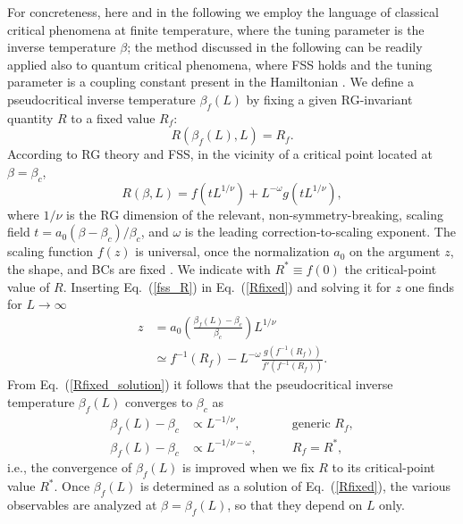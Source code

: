 \documentclass[pre,twocolumn]{revtex4-2}
\begin{document}
For concreteness, here and in the following we employ the language of classical critical phenomena at finite temperature, where the tuning parameter is the inverse temperature $\beta$;
the method discussed in the following can be readily applied also to quantum critical phenomena, where FSS holds and the tuning parameter is a coupling constant present in the Hamiltonian \cite{CPV-14}.
We define a pseudocritical inverse temperature $\beta_f(L)$ by fixing a given RG-invariant quantity $R$ to a fixed value $R_f$:
\begin{equation}
  R(\beta_f(L), L) = R_f.
  \label{Rfixed}
\end{equation}
According to RG theory and FSS, in the vicinity of a critical point located at $\beta=\beta_c$,
\begin{equation}
  R(\beta, L) = f(t L^{1/\nu}) + L^{-\omega}g(t L^{1/\nu}),
  \label{fss_R}
\end{equation}
where $1/\nu$ is the RG dimension of the relevant, non-symmetry-breaking, scaling field $t = a_0(\beta-\beta_c)/\beta_c$, and $\omega$ is the leading correction-to-scaling exponent.
The scaling function $f(z)$ is universal, once the normalization $a_0$ on the argument $z$, the shape, and BCs are fixed \cite{KOK-99,PTD-10,HGS-11,MFG-14}.
We indicate with $R^*\equiv f(0)$ the critical-point value of $R$.
Inserting Eq.~(\ref{fss_R}) in Eq.~(\ref{Rfixed}) and solving it for $z$ one finds for $L\rightarrow\infty$
\begin{equation}
  \begin{split}
    z &= a_0\left(\frac{\beta_f(L)-\beta_c}{\beta_c}\right)L^{1/\nu}\\
    &\simeq f^{-1}(R_f) - L^{-\omega}\frac{g(f^{-1}(R_f))}{f'(f^{-1}(R_f))}.
  \end{split}
  \label{Rfixed_solution}
\end{equation}
From Eq.~(\ref{Rfixed_solution}) it follows that the pseudocritical inverse temperature $\beta_f(L)$ converges to $\beta_c$ as
\begin{align}
  \label{betaf_vs_betac_gen}
  \beta_f(L)-\beta_c &\propto L^{-1/\nu}, \qquad &\text{generic $R_f$},\\
  \label{betaf_vs_betac_crit}
  \beta_f(L)-\beta_c &\propto L^{-1/\nu-\omega}, \qquad &R_f=R^*,
\end{align}
i.e., the convergence of $\beta_f(L)$ is improved when we fix $R$ to its critical-point value $R^*$.
Once $\beta_f(L)$ is determined as a solution of Eq.~(\ref{Rfixed}), the various observables are analyzed at $\beta=\beta_f(L)$, so that they depend on $L$ only.
\end{document}
